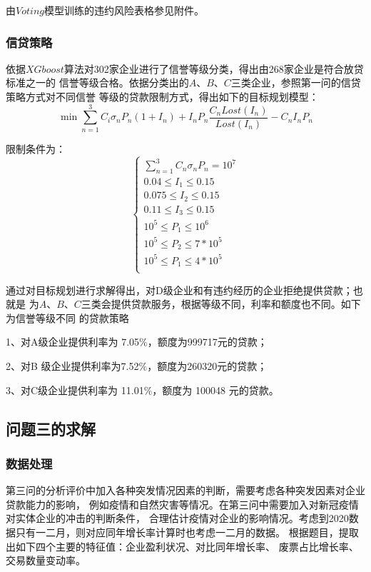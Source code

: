 \documentclass[UTF8]{ctexart}
\begin{document}
	由$Voting$模型训练的违约风险表格参见附件。

	\subsubsection{信贷策略}
	依据$XGboost$算法对302家企业进行了信誉等级分类，得出由268家企业是符合放贷标准之一的
	信誉等级合格。依据分类出的$A$、$B$、$C$三类企业，参照第一问的信贷策略方式对不同信誉
	等级的贷款限制方式，得出如下的目标规划模型：
	\begin{equation}
		\min \sum_{n = 1}^{3}C_i\sigma_n P_n (1+I_n)+I_n P_n \frac{C_n Lost(I_n)}{Lost(I_n)}-C_n I_n P_n  
	\end{equation}
	
	\newpage
	
	限制条件为：
	\[\left\{\begin{array}{lllll}
		\sum_{n = 1}^{3}C_n \sigma_n P_n = 10^7 \\
		0.04 \le I_1 \le 0.15\\
		0.075 \le I_2 \le 0.15\\
		0.11 \le I_3 \le 0.15\\
		10^5 \le P_1 \le 10^6\\
		10^5 \le P_2 \le 7*10^5\\
		10^5 \le P_1 \le 4*10^5\\

		\end{array}\right. \]

	通过对目标规划进行求解得出，对D级企业和有违约经历的企业拒绝提供贷款；也就是
	为$A$、$B$、$C$三类会提供贷款服务，根据等级不同，利率和额度也不同。如下为信誉等级不同
	的贷款策略
	
	1、对A级企业提供利率为 7.05$\%$，额度为999717元的贷款；

	2、对B 级企业提供利率为7.52$\%$，额度为260320元的贷款；
	
	3、对C级企业提供利率为 11.01$\%$，额度为 100048 元的贷款。
\subsection{问题三的求解}
\subsubsection{数据处理}
第三问的分析评价中加入各种突发情况因素的判断，需要考虑各种突发因素对企业贷款能力的影响，
例如疫情和自然灾害等情况。在第三问中需要加入对新冠疫情对实体企业的冲击的判断条件，
合理估计疫情对企业的影响情况。考虑到2020数据只有一二月，则对应同年增长率计算时也考虑一二月的数据。
根据题目，提取出如下四个主要的特征值：企业盈利状况、对比同年增长率、
废票占比增长率、交易数量变动率。
\end{document}
